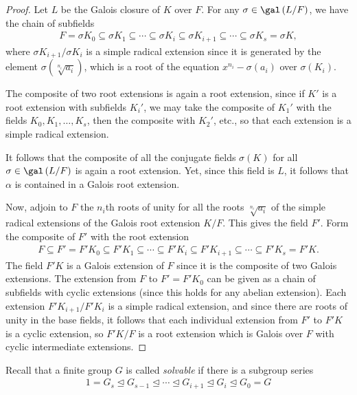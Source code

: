 \documentclass[10pt]{mypackage}
\begin{document}
\begin{proof}
  Let $L$ be the Galois closure of $K$ over $F$. For any $\sigma\in \gal\left( L/F \right)$, we have the chain of subfields
  \begin{align*}
    F = \sigma K_0 \subseteq \sigma K_1\subseteq\cdots\subseteq \sigma K_{i}\subseteq \sigma K_{i+1}\subseteq\cdots\subseteq \sigma K_s = \sigma K,
  \end{align*}
  where $\sigma K_{i+1}/\sigma K_i$ is a simple radical extension since it is generated by the element $\sigma\left( \sqrt[n_i]{a_i} \right)$, which is a root of the equation $x^{n_i}-\sigma\left( a_i \right)$ over $\sigma\left( K_i \right)$.

  The composite of two root extensions is again a root extension, since if $K'$ is a root extension with subfields $K_i'$, we may take the composite of $K_1'$ with the fields $K_0,K_1,\dots,K_s$, then the composite with $K_2'$, etc., so that each extension is a simple radical extension.

  It follows that the composite of all the conjugate fields $\sigma\left( K \right)$ for all $\sigma\in \gal\left( L/F \right)$ is again a root extension. Yet, since this field is $L$, it follows that $\alpha$ is contained in a Galois root extension.

  Now, adjoin to $F$ the $n_i$th roots of unity for all the roots $\sqrt[n_i]{a_i}$ of the simple radical extensions of the Galois root extension $K/F$. This gives the field $F'$. Form the composite of $F'$ with the root extension
  \begin{align*}
    F\subseteq F' = F'K_0 \subseteq F'K_1\subseteq\cdots\subseteq F'K_i\subseteq F'K_{i+1}\subseteq\cdots\subseteq F'K_s = F'K.
  \end{align*}
  The field $F'K$ is a Galois extension of $F$ since it is the composite of two Galois extensions. The extension from $F$ to $F' = F'K_0$ can be given as a chain of subfields with cyclic extensions (since this holds for any abelian extension). Each extension $F'K_{i+1}/F'K_i$ is a simple radical extension, and since there are roots of unity in the base fields, it follows that each individual extension from $F'$ to $F'K$ is a cyclic extension, so $F'K/F$ is a root extension which is Galois over $F$ with cyclic intermediate extensions.
\end{proof}
Recall that a finite group $G$ is called \textit{solvable} if there is a subgroup series
\begin{align*}
  1 = G_s\trianglelefteq G_{s-1}\trianglelefteq\cdots\trianglelefteq G_{i+1} \trianglelefteq G_i\trianglelefteq G_0=G
\end{align*}
\end{document}
